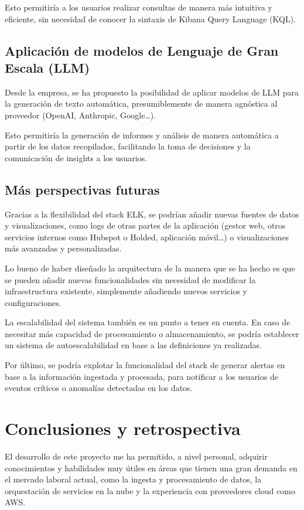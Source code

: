 Esto permitiría a los usuarios realizar consultas de manera más intuitiva y
eficiente, sin necesidad de conocer la sintaxis de Kibana Query Language (KQL).


\subsection{Aplicación de modelos de Lenguaje de Gran Escala (LLM)}
Desde la empresa, se ha propuesto la posibilidad de aplicar modelos de LLM
para la generación de texto automática, presumiblemente de manera agnóstica al
proveedor (OpenAI, Anthropic, Google\ldots).

Esto permitiría la generación de informes y análisis de manera automática a
partir de los datos recopilados, facilitando la toma de decisiones y la
comunicación de insights a los usuarios.

\subsection{Más perspectivas futuras}
Gracias a la flexibilidad del stack ELK, se podrían añadir nuevas fuentes de
datos y visualizaciones, como logs de otras partes de la aplicación (gestor web,
otros servicios internos como Hubspot o Holded, aplicación móvil\ldots) o
visualizaciones más avanzadas y personalizadas.

Lo bueno de haber diseñado la arquitectura de la manera que se ha hecho
es que se pueden añadir nuevas funcionalidades sin necesidad de modificar
la infraestructura existente, simplemente añadiendo nuevos servicios y
configuraciones.

La escalabilidad del sistema también es un punto a tener en cuenta. En caso de
necesitar más capacidad de procesamiento o almacenamiento, se podría establecer
un sistema de autoescalabilidad en base a las definiciones ya realizadas.

Por último, se podría explotar la funcionalidad del stack de generar alertas
en base a la información ingestada y procesada, para notificar a los usuarios
de eventos críticos o anomalías detectadas en los datos.


\newpage{}
\section{Conclusiones y retrospectiva}
El desarrollo de este proyecto me ha permitido, a nivel personal, adquirir
conocimientos y habilidades muy útiles en áreas que tienen una gran demanda en
el mercado laboral actual, como la ingesta y procesamiento de datos, la
orquestación de servicios en la nube y la experiencia con proveedores cloud como
AWS.

